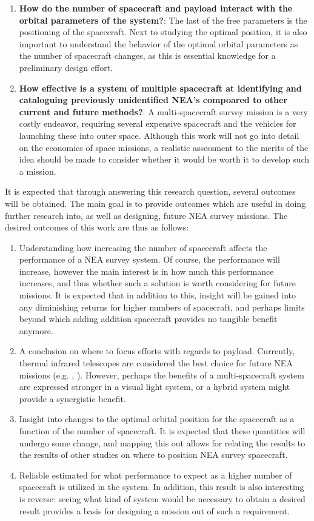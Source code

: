 \begin{enumerate}
 \item \textbf{How do the number of spacecraft and payload interact with the orbital parameters of the system?}: The last of the free parameters is the positioning of the spacecraft. Next to studying the optimal position, it is also important to understand the behavior of the optimal orbital parameters as the number of spacecraft changes, as this is essential knowledge for a preliminary design effort.
 \item \textbf{How effective is a system of multiple spacecraft at identifying and cataloguing previously unidentified NEA's compoared to other current and future methods?}: A multi-spacecraft survey mission is a very costly endeavor, requiring several expensive spacecraft and the vehicles for launching these into outer space. Although this work will not go into detail on the economics of space missions, a realistic assessment to the merits of the idea should be made to consider whether it would be worth it to develop such a mission. 
\end{enumerate}

It is expected that through answering this research question, several outcomes will be obtained. The main goal is to provide outcomes which are useful in doing further research into, as well as designing, future NEA survey missions. The desired outcomes of this work are thus as follows:
\begin{enumerate}
 \item Understanding how increasing the number of spacecraft affects the performance of a NEA survey system. Of course, the performance will increase, however the main interest is in how much this performance increases, and thus whether such a solution is worth considering for future missions. It is expected that in addition to this, insight will be gained into any diminishing returns for higher numbers of spacecraft, and perhaps limits beyond which adding addition spacecraft provides no tangible benefit anymore.
 \item A conclusion on where to focus efforts with regards to payload. Currently, thermal infrared telescopes are considered the best choice for future NEA missions (e.g. \cite{2017NEOSDT}, \cite{ThesisOlga}). However, perhaps the benefits of a multi-spacecraft system are expressed stronger in a visual light system, or a hybrid system might provide a synergistic benefit.
 \item Insight into changes to the optimal orbital position for the spacecraft as a function of the number of spacecraft. It is expected that these quantities will undergo some change, and mapping this out allows for relating the results to the results of other studies on where to position NEA survey spacecraft.
 \item Reliable estimated for what performance to expect as a higher number of spacecraft is utilized in the system. In addition, this result is also interesting is reverse: seeing what kind of system would be necessary to obtain a desired result provides a basis for designing a mission out of such a requirement.
\end{enumerate}

